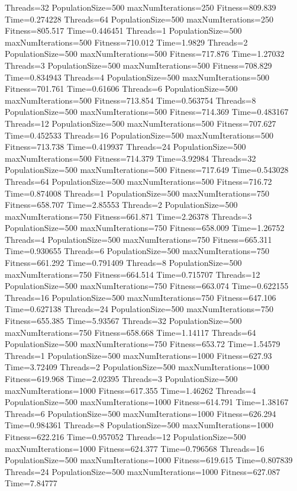\documentclass[10pt,letterpaper]{article}
\begin{document}
Threads=32 PopulationSize=500 maxNumIterations=250 Fitness=809.839 Time=0.274228
Threads=64 PopulationSize=500 maxNumIterations=250 Fitness=805.517 Time=0.446451
Threads=1 PopulationSize=500 maxNumIterations=500 Fitness=710.012 Time=1.9829
Threads=2 PopulationSize=500 maxNumIterations=500 Fitness=717.876 Time=1.27032
Threads=3 PopulationSize=500 maxNumIterations=500 Fitness=708.829 Time=0.834943
Threads=4 PopulationSize=500 maxNumIterations=500 Fitness=701.761 Time=0.61606
Threads=6 PopulationSize=500 maxNumIterations=500 Fitness=713.854 Time=0.563754
Threads=8 PopulationSize=500 maxNumIterations=500 Fitness=714.369 Time=0.483167
Threads=12 PopulationSize=500 maxNumIterations=500 Fitness=707.627 Time=0.452533
Threads=16 PopulationSize=500 maxNumIterations=500 Fitness=713.738 Time=0.419937
Threads=24 PopulationSize=500 maxNumIterations=500 Fitness=714.379 Time=3.92984
Threads=32 PopulationSize=500 maxNumIterations=500 Fitness=717.649 Time=0.543028
Threads=64 PopulationSize=500 maxNumIterations=500 Fitness=716.72 Time=0.874008
Threads=1 PopulationSize=500 maxNumIterations=750 Fitness=658.707 Time=2.85553
Threads=2 PopulationSize=500 maxNumIterations=750 Fitness=661.871 Time=2.26378
Threads=3 PopulationSize=500 maxNumIterations=750 Fitness=658.009 Time=1.26752
Threads=4 PopulationSize=500 maxNumIterations=750 Fitness=665.311 Time=0.930655
Threads=6 PopulationSize=500 maxNumIterations=750 Fitness=661.292 Time=0.791409
Threads=8 PopulationSize=500 maxNumIterations=750 Fitness=664.514 Time=0.715707
Threads=12 PopulationSize=500 maxNumIterations=750 Fitness=663.074 Time=0.622155
Threads=16 PopulationSize=500 maxNumIterations=750 Fitness=647.106 Time=0.627138
Threads=24 PopulationSize=500 maxNumIterations=750 Fitness=655.385 Time=5.93567
Threads=32 PopulationSize=500 maxNumIterations=750 Fitness=658.668 Time=1.14117
Threads=64 PopulationSize=500 maxNumIterations=750 Fitness=653.72 Time=1.54579
Threads=1 PopulationSize=500 maxNumIterations=1000 Fitness=627.93 Time=3.72409
Threads=2 PopulationSize=500 maxNumIterations=1000 Fitness=619.968 Time=2.02395
Threads=3 PopulationSize=500 maxNumIterations=1000 Fitness=617.355 Time=1.46262
Threads=4 PopulationSize=500 maxNumIterations=1000 Fitness=614.791 Time=1.38167
Threads=6 PopulationSize=500 maxNumIterations=1000 Fitness=626.294 Time=0.984361
Threads=8 PopulationSize=500 maxNumIterations=1000 Fitness=622.216 Time=0.957052
Threads=12 PopulationSize=500 maxNumIterations=1000 Fitness=624.377 Time=0.796568
Threads=16 PopulationSize=500 maxNumIterations=1000 Fitness=619.615 Time=0.807839
Threads=24 PopulationSize=500 maxNumIterations=1000 Fitness=627.087 Time=7.84777
\end{document}
